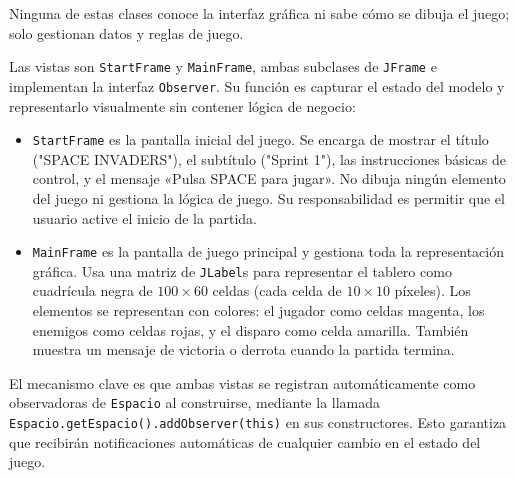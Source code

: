 \documentclass[12pt, a4paper]{article}
\begin{document}
\begin{description}[leftmargin=2em, style=nextline]
        Ninguna de estas clases conoce la interfaz gráfica ni sabe cómo se dibuja el juego; solo gestionan datos y reglas de juego.

    \item[\textbf{Vista}]
        Las vistas son \texttt{StartFrame} y \texttt{MainFrame}, ambas subclases de \texttt{JFrame} e implementan la interfaz \texttt{Observer}. Su función es capturar el estado del modelo y representarlo visualmente sin contener lógica de negocio:
        \begin{itemize}[leftmargin=2em]
            \item \texttt{StartFrame} es la pantalla inicial del juego. Se encarga de mostrar el título ("SPACE INVADERS"), el subtítulo ("Sprint 1"), las instrucciones básicas de control, y el mensaje «Pulsa SPACE para jugar». No dibuja ningún elemento del juego ni gestiona la lógica de juego. Su responsabilidad es permitir que el usuario active el inicio de la partida.
            \item \texttt{MainFrame} es la pantalla de juego principal y gestiona toda la representación gráfica. Usa una matriz de \texttt{JLabel}s para representar el tablero como cuadrícula negra de $100 \times 60$ celdas (cada celda de $10 \times 10$ píxeles). Los elementos se representan con colores: el jugador como celdas magenta, los enemigos como celdas rojas, y el disparo como celda amarilla. También muestra un mensaje de victoria o derrota cuando la partida termina.
        \end{itemize}

        El mecanismo clave es que ambas vistas se registran automáticamente como observadoras de \texttt{Espacio} al construirse, mediante la llamada \lstinline|Espacio.getEspacio().addObserver(this)| en sus constructores. Esto garantiza que recibirán notificaciones automáticas de cualquier cambio en el estado del juego.


\end{description}
\end{document}
